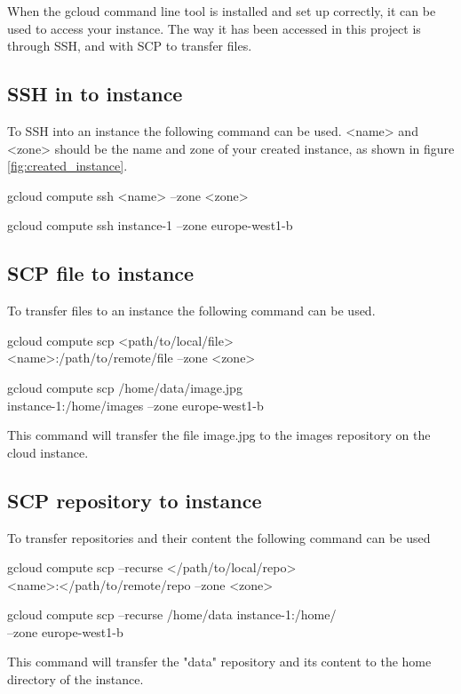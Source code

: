 When the gcloud command line tool is installed and set up correctly, it can be used to access your instance. The way it has been accessed in this project is through SSH, and with SCP to transfer files. 

\vspace{3mm}
\subsection{SSH in to instance}
To SSH into an instance the following command can be used. <name> and <zone> should be the name and zone of your created instance, as shown in figure \ref{fig:created_instance}.

\begin{lcverbatim}
    gcloud compute ssh <name> --zone <zone>
\end{lcverbatim}
\begin{lcverbatim}
    gcloud compute ssh instance-1 --zone europe-west1-b
\end{lcverbatim}

\subsection{SCP file to instance}
To transfer files to an instance the following command can be used. 
\begin{lcverbatim}
gcloud compute scp <path/to/local/file> \\ 
<name>:/path/to/remote/file --zone <zone>
\end{lcverbatim}
\begin{lcverbatim}
gcloud compute scp /home/data/image.jpg  \\
instance-1:/home/images --zone europe-west1-b
\end{lcverbatim}

This command will transfer the file image.jpg to the images repository on the cloud instance.

\subsection{SCP repository to instance}

\vspace{3mm}
To transfer repositories and their content the following command can be used

\begin{lcverbatim}
gcloud compute scp --recurse </path/to/local/repo> \\ 
<name>:</path/to/remote/repo --zone <zone>
\end{lcverbatim}

\begin{lcverbatim}
gcloud compute scp --recurse /home/data instance-1:/home/ \\ 
--zone europe-west1-b
\end{lcverbatim}
\vspace{3mm}

This command will transfer the "data" repository and its content to the home directory of the instance.

